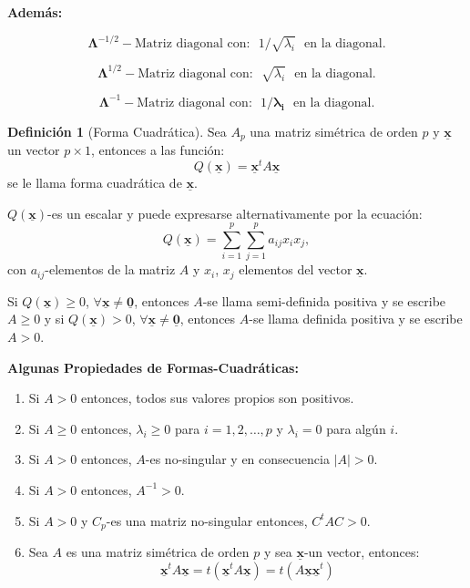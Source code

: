\documentclass[
]{book}
\theoremstyle{definition}
\newtheorem{definition}{Definición}[chapter]
\theoremstyle{definition}
\theoremstyle{definition}
\theoremstyle{definition}
\theoremstyle{remark}
\begin{document}
\textbf{Además:}

\[
\mathbf{\Lambda}^{-1/2}-\text{Matriz diagonal con:}\ \ \  1/\sqrt{\lambda_i} \ \ \ \text{en la diagonal}.
\]

\[
\mathbf{\Lambda}^{1/2}-\text{Matriz diagonal con:}\ \ \  \sqrt{\lambda_i}\ \ \ \text{en la diagonal}.
\]

\[
\mathbf{\Lambda}^{-1}-\text{Matriz diagonal con:}\ \ \  1/\mathbf{\lambda_i}\ \ \ \text{en la diagonal}.
\]

\begin{definition}[Forma Cuadrática]
\protect\hypertarget{def:forma-cuadratica}{}\label{def:forma-cuadratica}Sea \(A_p\) una matriz simétrica de orden \(p\) y \(\underline{\mathbf{x}}\) un vector \(p\times 1\), entonces a las función:
\[
Q(\underline{\mathbf{x}})=\underline{\mathbf{x}}^t A \underline{\mathbf{x}}
\]
se le llama forma cuadrática de \(\underline{\mathbf{x}}\).

\(Q(\underline{\mathbf{x}})\)-es un escalar y puede expresarse alternativamente por la ecuación:
\[
Q(\underline{\mathbf{x}})=\sum_{i=1}^p \sum_{j=1}^p a_{ij}x_i x_j,
\]
con \(a_{ij}\)-elementos de la matriz \(A\) y \(x_i\), \(x_j\) elementos del vector \(\underline{\mathbf{x}}\).

Si \(Q(\underline{\mathbf{x}})\geq 0\), \(\forall \underline{\mathbf{x}} \neq \underline{\mathbf{0}}\), entonces \(A\)-se llama semi-definida positiva y se escribe \(A\geq 0\) y si \(Q(\underline{\mathbf{x}})> 0\), \(\forall \underline{\mathbf{x}} \neq \underline{\mathbf{0}}\), entonces \(A\)-se llama definida positiva y se escribe \(A> 0\).
\end{definition}

\textbf{Algunas Propiedades de Formas-Cuadráticas:}

\begin{enumerate}
\def\labelenumi{\alph{enumi}.}
\item
  Si \(A>0\) entonces, todos sus valores propios son positivos.
\item
  Si \(A \geq 0\) entonces, \(\lambda_i \geq 0\) para \(i=1,2,\ldots,p\) y \(\lambda_i=0\) para algún \(i\).
\item
  Si \(A > 0\) entonces, \(A\)-es no-singular y en consecuencia \(|A|>0\).
\item
  Si \(A>0\) entonces, \(A^{-1}>0\).
\item
  Si \(A>0\) y \(C_p\)-es una matriz no-singular entonces, \(C^tAC>0\).
\item
  Sea \(A\) es una matriz simétrica de orden \(p\) y sea \(\underline{\mathbf{x}}\)-un vector, entonces:
  \[
  \underline{\mathbf{x}}^t A \underline{\mathbf{x}}=t(\underline{\mathbf{x}}^t A \underline{\mathbf{x}})=t( A \underline{\mathbf{x}}\underline{\mathbf{x}}^t)
  \]
\end{enumerate}
\end{document}
